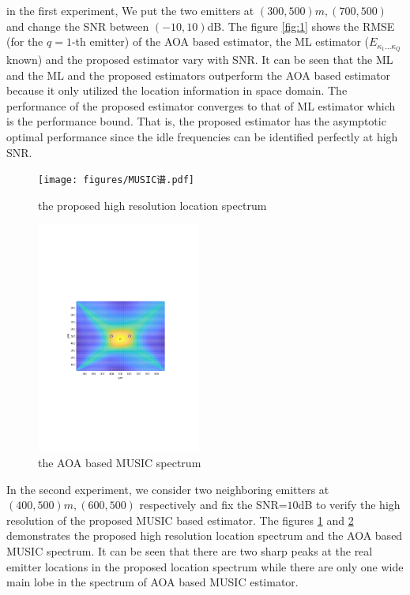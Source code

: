 \documentclass[journal,10pt]{IEEEtran}
\begin{document}
in the first experiment, We put the two emitters at $(300,500)m,(700,500)$ and change the SNR between $(-10,10)$dB.
The figure \ref{fig:1} shows the RMSE (for the $q=1$-th emitter) of the AOA based estimator, the ML estimator ($E_{\kappa_1\dots\kappa_Q}$ known) and the proposed estimator vary with SNR. 
It can be seen that the ML and the ML and the proposed estimators outperform the AOA based estimator because it only utilized the location information in space domain.
The performance of the proposed estimator converges to that of ML estimator which is the performance bound. That is, the proposed estimator has the asymptotic optimal performance 
since the idle frequencies can be identified perfectly at high SNR.

\begin{figure}[!t] 
	\centerline{\texttt{[image: figures/MUSIC谱.pdf]}}
	\caption{the proposed high resolution location spectrum}\label{fig:2}
\end{figure}

\begin{figure}[!t] 
	\centerline{\includegraphics[width=0.48\textwidth]{figures/SML位置谱.pdf}}
	\caption{the AOA based MUSIC spectrum}\label{fig:3}
\end{figure}

In the second experiment, we consider two neighboring emitters at $(400,500)m,(600,500)$ respectively and fix the SNR=$10$dB to verify the high resolution of the proposed MUSIC based estimator. 
The figures \ref{fig:2} and \ref{fig:3} demonstrates the proposed high resolution location spectrum and the AOA based MUSIC spectrum. It can be seen that there are two sharp peaks at the real emitter locations in the proposed location spectrum 
while there are only one wide main lobe in the spectrum of AOA based MUSIC estimator.
\end{document}
